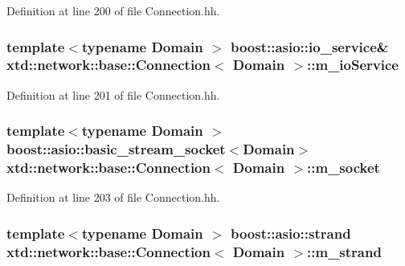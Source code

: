 Definition at line 200 of file Connection.\+hh.

\subsubsection[{\texorpdfstring{m\+\_\+io\+Service}{m_ioService}}]{\setlength{\rightskip}{0pt plus 5cm}template$<$typename Domain $>$ boost\+::asio\+::io\+\_\+service\& {\bf xtd\+::network\+::base\+::\+Connection}$<$ Domain $>$\+::m\+\_\+io\+Service\hspace{0.3cm}{\ttfamily [protected]}}\hypertarget{classxtd_1_1network_1_1base_1_1Connection_aee549e0f84206cc897371ec3ba2cba49}{}\label{classxtd_1_1network_1_1base_1_1Connection_aee549e0f84206cc897371ec3ba2cba49}


Definition at line 201 of file Connection.\+hh.

\subsubsection[{\texorpdfstring{m\+\_\+socket}{m_socket}}]{\setlength{\rightskip}{0pt plus 5cm}template$<$typename Domain $>$ boost\+::asio\+::basic\+\_\+stream\+\_\+socket$<$Domain$>$ {\bf xtd\+::network\+::base\+::\+Connection}$<$ Domain $>$\+::m\+\_\+socket\hspace{0.3cm}{\ttfamily [protected]}}\hypertarget{classxtd_1_1network_1_1base_1_1Connection_af054fe7efb3d4f8a1a0f40c0e74e8c70}{}\label{classxtd_1_1network_1_1base_1_1Connection_af054fe7efb3d4f8a1a0f40c0e74e8c70}


Definition at line 203 of file Connection.\+hh.

\subsubsection[{\texorpdfstring{m\+\_\+strand}{m_strand}}]{\setlength{\rightskip}{0pt plus 5cm}template$<$typename Domain $>$ boost\+::asio\+::strand {\bf xtd\+::network\+::base\+::\+Connection}$<$ Domain $>$\+::m\+\_\+strand\hspace{0.3cm}{\ttfamily [protected]}}\hypertarget{classxtd_1_1network_1_1base_1_1Connection_afdbd7eaed6dc0b71b05a6ef3be2f417d}{}\label{classxtd_1_1network_1_1base_1_1Connection_afdbd7eaed6dc0b71b05a6ef3be2f417d}


